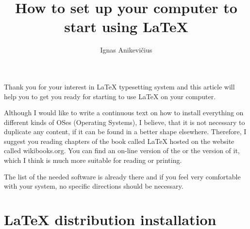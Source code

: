 \documentclass[
    draft
]{scrartcl}
\title{How to set up your computer to start using \LaTeX{}}
\author{Ignas Anikevičius}
\begin{document}
\maketitle
\tableofcontents
\listoftodos{\vskip 1em}

%
Thank you for your interest in \LaTeX{} typesetting system and this article
    will help you to get you ready for starting to use \LaTeX{} on your
    computer.

%
Although I would like to write a continuous text on how to install
    everything on different kinds of OSes (Operating Systems), I believe, that
    it is not necessary to duplicate any content, if it can be found in a better
    shape elsewhere. 
%
Therefore, I suggest you reading chapters of the book called \LaTeX{} hosted on
    the website called wikibooks.org. 
%
You can find an on-line version of the
     or the
    version of it, which I think is much more suitable for reading or printing.

%
The list of the needed software is already there and if you feel very
    comfortable with your system, no specific directions should be necessary.


\section{\LaTeX{} distribution installation}
\end{document}

